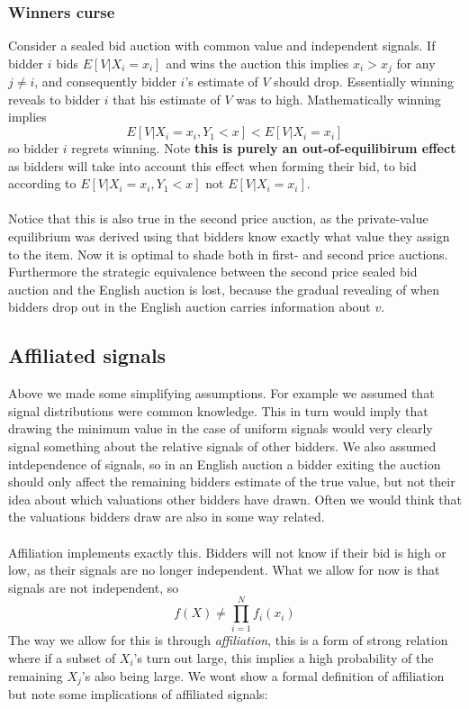 \subsubsection{Winners curse}
Consider a sealed bid auction with common value and independent signals. If bidder $i$ bids $E[V|X_i = x_i]$ and wins the auction this implies $x_i>x_j$ for any $j\neq i$, and consequently bidder $i$'s estimate of $V$ should drop. Essentially winning reveals to bidder $i$ that his estimate of $V$ was to high. Mathematically winning implies
\begin{equation}
  E[V|X_i = x_i, Y_1 < x] < E[V|X_i = x_i]
\end{equation}
so bidder $i$ regrets winning. Note \textbf{this is purely an out-of-equilibirum effect} as bidders will take into account this effect when forming their bid, to bid according to $E[V|X_i = x_i, Y_1 < x]$ not $E[V|X_i = x_i]$.
\\ \\
Notice that this is also true in the second price auction, as the private-value equilibrium was derived using that bidders know exactly what value they assign to the item. Now it is optimal to shade both in first- and second price auctions. Furthermore the strategic equivalence between the second price sealed bid auction and the English auction is lost, because the gradual revealing of when bidders drop out in the English auction carries information about $v$.


\subsection{Affiliated signals}
Above we made some simplifying assumptions. For example we assumed that signal distributions were common knowledge. This in turn would imply that drawing the minimum value in the case of uniform signals would very clearly signal something about the relative signals of other bidders. We also assumed intdependence of signals, so in an English auction a bidder exiting the auction should only affect the remaining bidders estimate of the true value, but not their idea about which valuations other bidders have drawn. Often we would think that the valuations bidders draw are also in some way related.
\\ \\
Affiliation implements exactly this. Bidders will not know if their bid is high or low, as their signals are no longer independent. What we allow for now is that signals are not independent, so
\begin{equation}
  f(X) \neq \prod_{i=1}^N f_i(x_i)
\end{equation}
The way we allow for this is through \textit{affiliation}, this is a form of strong relation where if a subset of $X_i$'s turn out large, this implies a high probability of the remaining $X_j$'s also being large. We wont show a formal definition of affiliation but note some implications of affiliated signals:

